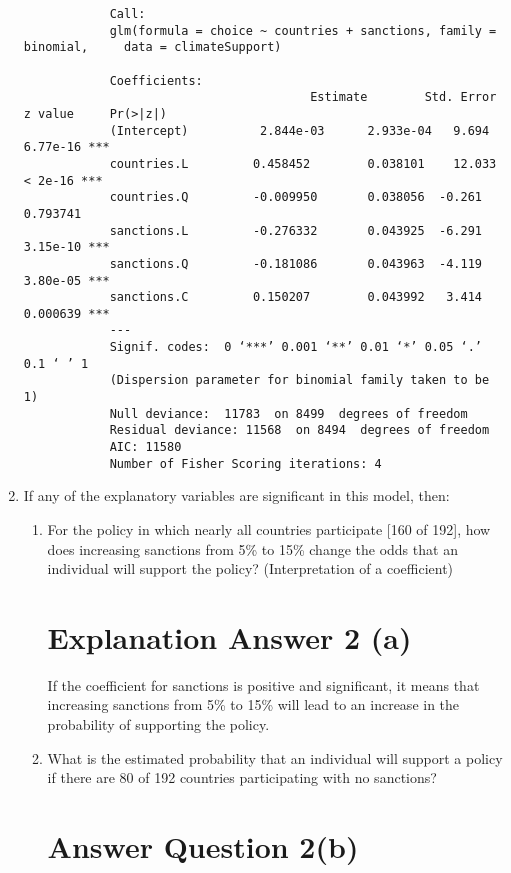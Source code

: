 \documentclass[12pt,letterpaper]{article}
\begin{document}
\begin{enumerate}
				\begin{verbatim}
			Call:
			glm(formula = choice ~ countries + sanctions, family = binomial,     data = climateSupport)
			
			Coefficients:  
			        					Estimate  		Std. Error  	z value  	Pr(>|z|)
			(Intercept)          2.844e-03  	2.933e-04   9.694 		6.77e-16 ***
			countries.L  		0.458452   		0.038101  	12.033  	< 2e-16 ***
			countries.Q 		-0.009950   	0.038056  -0.261 	0.793741    
			sanctions.L 		-0.276332   	0.043925  -6.291 	3.15e-10 ***
			sanctions.Q 		-0.181086   	0.043963  -4.119 	3.80e-05 ***
			sanctions.C  		0.150207   		0.043992   3.414 		0.000639 ***
			---
			Signif. codes:  0 ‘***’ 0.001 ‘**’ 0.01 ‘*’ 0.05 ‘.’ 0.1 ‘ ’ 1
			(Dispersion parameter for binomial family taken to be 1)    
			Null deviance: 	11783  on 8499  degrees of freedom
			Residual deviance: 11568  on 8494  degrees of freedom
			AIC: 11580
			Number of Fisher Scoring iterations: 4
		\end{verbatim}
	
	\item
	If any of the explanatory variables are significant in this model, then:
	\begin{enumerate}
		\item
		For the policy in which nearly all countries participate [160 of 192], how does increasing sanctions from 5\% to 15\% change the odds that an individual will support the policy? (Interpretation of a coefficient)
	\section*{Explanation Answer 2 (a)} 
\vspace{.25cm}
\noindent If the coefficient for sanctions is positive and significant, it means that increasing sanctions from 5\% to 15\% will lead to an increase in the probability of supporting the policy.

		\item
		What is the estimated probability that an individual will support a policy if there are 80 of 192 countries participating with no sanctions? 
		
				\section*{Answer Question 2(b)}
		

\end{enumerate}
\end{enumerate}
\end{document}
